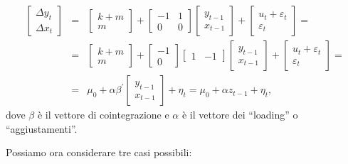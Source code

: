 \begin{eqnarray*}
  \left[  \begin{array}{c} \Delta y_t \\ \Delta x_t \end{array} \right]  & = & 
  \left[  \begin{array}{c} k + m \\ m \end{array} \right] +
  \left[  \begin{array}{rr} -1 & 1 \\ 0 & 0 \end{array} \right] 
  \left[  \begin{array}{c} y_{t-1} \\ x_{t-1} \end{array} \right] + 
  \left[  \begin{array}{c} u_t + \varepsilon_t \\ \varepsilon_t \end{array} \right] = \\
  & = & 
  \left[  \begin{array}{c} k + m \\ m \end{array} \right] +
  \left[  \begin{array}{r} -1 \\ 0 \end{array} \right]
  \left[  \begin{array}{rr} 1 & -1 \end{array} \right] 
  \left[  \begin{array}{c} y_{t-1} \\ x_{t-1} \end{array} \right] + 
  \left[  \begin{array}{c} u_t + \varepsilon_t \\ \varepsilon_t \end{array} \right] = \\
  & = & 
  \mu_0 + \alpha \beta^{\prime} \left[  \begin{array}{c} y_{t-1} \\ x_{t-1} \end{array} \right] + \eta_t = 
  \mu_0 + \alpha z_{t-1} + \eta_t ,
\end{eqnarray*}
%	
dove $\beta$ è il vettore di cointegrazione e $\alpha$ è il vettore
dei ``loading'' o ``aggiustamenti''.
     
Possiamo ora considerare tre casi possibili:
    
